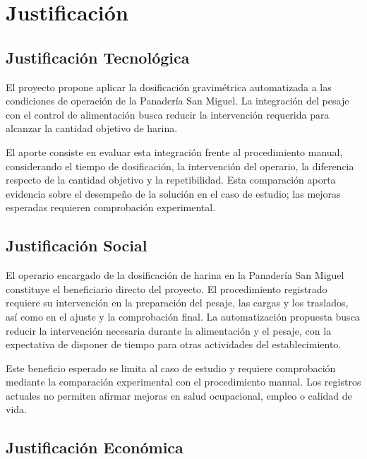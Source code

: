 
\section{Justificación}
\label{sec:justificacion}

\subsection{Justificación Tecnológica}
\label{subsec:justificacion_tecnologica}

El proyecto propone aplicar la dosificación gravimétrica automatizada
a las condiciones de operación de la Panadería San Miguel. La integración
del pesaje con el control de alimentación busca reducir la intervención
requerida para alcanzar la cantidad objetivo de harina.

El aporte consiste en evaluar esta integración frente al procedimiento
manual, considerando el tiempo de dosificación, la intervención del
operario, la diferencia respecto de la cantidad objetivo y la
repetibilidad. Esta comparación aporta evidencia sobre el desempeño de
la solución en el caso de estudio; las mejoras esperadas requieren
comprobación experimental.

\subsection{Justificación Social}
\label{subsec:justificacion_social}

El operario encargado de la dosificación de harina en la Panadería San
Miguel constituye el beneficiario directo del proyecto. El procedimiento
registrado requiere su intervención en la preparación del pesaje, las
cargas y los traslados, así como en el ajuste y la comprobación final.
La automatización propuesta busca reducir la intervención necesaria
durante la alimentación y el pesaje, con la expectativa de disponer de
tiempo para otras actividades del establecimiento.

Este beneficio esperado se limita al caso de estudio y requiere
comprobación mediante la comparación experimental con el procedimiento
manual. Los registros actuales no permiten afirmar mejoras en salud
ocupacional, empleo o calidad de vida.

\subsection{Justificación Económica}
\label{subsec:justificacion_economica}

